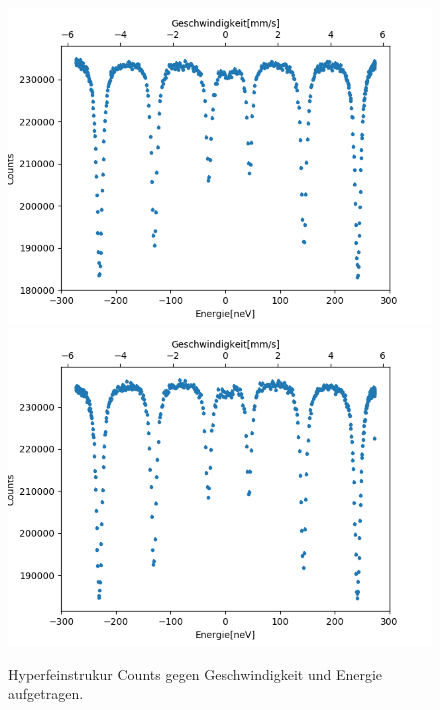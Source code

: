 \documentclass[12pt,a4paper]{article}
\begin{document}
\begin{figure}
\centering
\includegraphics[scale=0.8]{Bilder/Hyperfein/Hyper_Data_vor.png}
\includegraphics[scale=0.8]{Bilder/Hyperfein/Hyper_Data_nach.png}
\caption{Hyperfeinstrukur Counts gegen Geschwindigkeit und Energie aufgetragen.}
\label{fig:Hyper_Data}
\end{figure}
\end{document}
